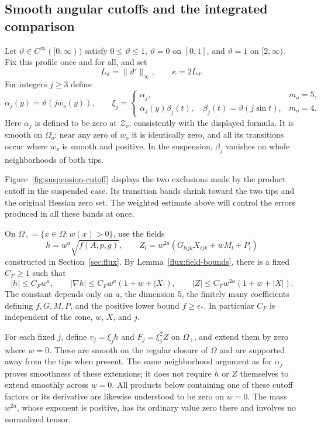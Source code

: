 \subsection{Smooth angular cutoffs and the integrated comparison}

Let $\vartheta\in C^\infty([0,\infty))$ satisfy $0\leq\vartheta\leq1$,
$\vartheta=0$ on $[0,1]$, and $\vartheta=1$ on $[2,\infty)$.  Fix this
profile once and for all, and set
\[
 L_\vartheta=\|\vartheta'\|_\infty,
 \qquad \kappa=2L_\vartheta.
\]
For integers $j\geq3$ define
\begin{equation}\label{cut:cutoffs}
 \alpha_j(y)=\vartheta(jw_o(y)),\qquad
 \xi_j=
 \begin{cases}
  \alpha_j,&m_o=5,\\
  \alpha_j(y)\beta_j(t),\quad
       \beta_j(t)=\vartheta(j\sin t),&m_o=4.
 \end{cases}
\end{equation}
Here $\alpha_j$ is defined to be zero at $\mathcal Z_o$, consistently with
the displayed formula.  It is smooth on $\overline\Omega_o$: near any zero
of $w_o$ it is identically zero, and all its transitions occur where $w_o$
is smooth and positive.  In the suspension, $\beta_j$ vanishes on whole
neighborhoods of both tips.

Figure~\ref{fig:suspension-cutoff} displays the two exclusions made by
the product cutoff in the suspended case. Its transition bands shrink
toward the two tips and the original Hessian zero set. The weighted
estimate above will control the errors produced in all these bands
at once.


On $\Omega_+=\{x\in\Omega:w(x)>0\}$, use the fields
\[
 h=w^a\sqrt{f(A,p,g)},\qquad
 Z_l=w^{2a}(G_{lijk}X_{ijk}+wM_l+P_l)
\]
constructed in Section~\ref{sec:flux}.  By Lemma~\ref{flux:field-bounds},
there is a fixed $C_F\geq1$ such that
\begin{equation}\label{cut:field-estimates}
 |h|\leq C_Fw^a,\qquad
 |\nabla h|\leq C_Fw^a(1+w+|X|),\qquad
 |Z|\leq C_Fw^{2a}(1+w+|X|).
\end{equation}
The constant depends only on $a$, the dimension $5$, the finitely many
coefficients defining $f,G,M,P$, and the positive lower bound
$f\geq\epsilon_*$.  In particular $C_F$ is independent of the cone,
$w$, $X$, and $j$.

For each fixed $j$, define $v_j=\xi_jh$ and $F_j=\xi_j^2Z$ on $\Omega_+$,
and extend them by zero where $w=0$.  These are smooth on the regular
closure of $\Omega$ and are supported away from the tips when present.
The same neighborhood argument as for $\alpha_j$ proves smoothness of
these extensions; it does not require $h$ or $Z$ themselves to extend
smoothly across $w=0$.  All products below containing one of these cutoff
factors or its derivative are likewise understood to be zero on $w=0$.
The mass $w^{2a}$, whose exponent is positive, has its ordinary value zero
there and involves no normalized tensor.

